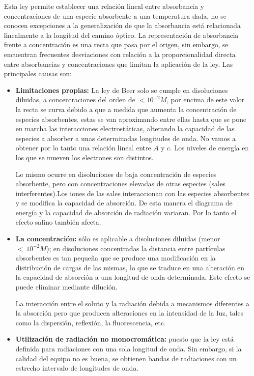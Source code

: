 Esta ley permite establecer una relación lineal entre absorbancia y concentraciones de una especie absorbente a una temperatura dada, no se conocen excepciones a la generalización de que la absorbancia está relacionada linealmente a la longitud del camino óptico. La representación de absorbancia frente a concentración es una recta que pasa por el origen, sin embargo, se encuentran frecuentes desviaciones con relación a la proporcionalidad directa entre absorbancias y concentraciones que limitan la aplicación de la ley. Las principales causas son:
\begin{itemize}
    \item  \textbf{\textcolor{morado}{Limitaciones propias:}} La ley de Beer solo se cumple en disoluciones diluidas, a concentraciones del orden de $<10^{-2} M$, por encima de este valor la recta se curva debido a que a medida que aumenta la concentración de especies absorbentes, estas se van aproximando entre ellas hasta que se pone en marcha las interacciones electrostáticas, alterando la capacidad de las especies a absorber a unas determinadas longitudes de onda. No vamos a obtener por lo tanto una relación lineal entre $A$ y $c$. Los niveles de energía en los que se mueven los electrones son distintos.
    
    Lo mismo ocurre en disoluciones de baja concentración de especies absorbente, pero con concentraciones elevadas de otras especies (sales interferentes).Los iones de las sales interaccionan con las especies absorbentes y se modifica la capacidad de absorción. De esta manera el diagrama de energía y la capacidad de absorción de radiación variaran. Por lo tanto el efecto salino también afecta. 
    \item \textbf{\textcolor{morado}{La concentración:}} sólo es aplicable a disoluciones diluidas (menor $<~10^{-2} M$); en disoluciones concentradas la distancia entre partículas absorbentes es tan pequeña que se produce una modificación en la distribución de cargas de las mismas, lo que se traduce en una alteración en la capacidad de absorción a una longitud de onda determinada. Este efecto se puede eliminar mediante dilución. 
    
    La interacción entre el soluto y la radiación debida a mecanismos diferentes a la absorción pero que producen alteraciones en la intensidad de la luz, tales como la dispersión, reflexión, la fluorescencia, etc. 
    \item \textbf{\textcolor{morado}{Utilización de radiación no monocromática:}} puesto que la ley está definida para radiaciones con una sola longitud de onda. Sin embargo, si la calidad del equipo no es buena, se obtienen bandas de radiaciones con un estrecho intervalo de longitudes de onda.
\end{itemize}

